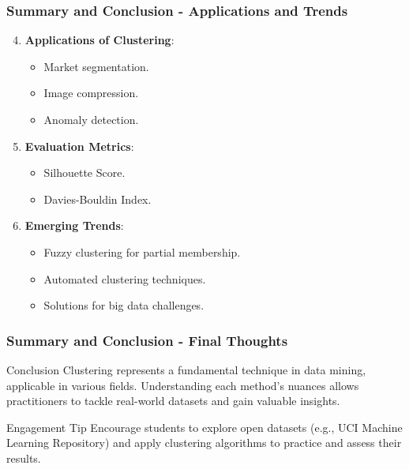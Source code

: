 \documentclass[aspectratio=169]{beamer}
\begin{document}
\begin{frame}[fragile]
    \frametitle{Summary and Conclusion - Applications and Trends}
    \begin{enumerate}
        \setcounter{enumi}{3}
        \item \textbf{Applications of Clustering}:
        \begin{itemize}
            \item Market segmentation.
            \item Image compression.
            \item Anomaly detection.
        \end{itemize}
        \item \textbf{Evaluation Metrics}:
        \begin{itemize}
            \item Silhouette Score.
            \item Davies-Bouldin Index.
        \end{itemize}
        \item \textbf{Emerging Trends}:
        \begin{itemize}
            \item Fuzzy clustering for partial membership.
            \item Automated clustering techniques.
            \item Solutions for big data challenges.
        \end{itemize}
    \end{enumerate}
\end{frame}

\begin{frame}[fragile]
    \frametitle{Summary and Conclusion - Final Thoughts}
    \begin{block}{Conclusion}
        Clustering represents a fundamental technique in data mining, applicable in various fields. Understanding each method's nuances allows practitioners to tackle real-world datasets and gain valuable insights.
    \end{block}
    \begin{block}{Engagement Tip}
        Encourage students to explore open datasets (e.g., UCI Machine Learning Repository) and apply clustering algorithms to practice and assess their results.
    \end{block}
\end{frame}
\end{document}
